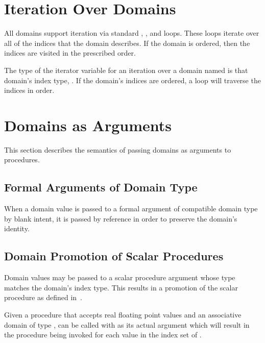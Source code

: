\section{Iteration Over Domains}
\label{Iteration_over_Domains}

All domains support iteration via standard , , and 
loops.  These loops iterate over all of the indices that the domain
describes.  If the domain is ordered, then the indices are visited in the
prescribed order.  

The type of the iterator variable for an iteration over a
domain named  is that domain's index type, .
If the domain's indices are ordered, a  loop will traverse the
indices in order.


\section{Domains as Arguments}
\label{Domain_Arguments}

This section describes the semantics of passing domains as arguments
to procedures.

\subsection{Formal Arguments of Domain Type}

When a domain value is passed to a formal argument of compatible
domain type by blank intent, it is passed by reference in order to
preserve the domain's identity.

\subsection{Domain Promotion of Scalar Procedures}
\label{Domain_Promotion_of_Scalar_Procedures}

Domain values may be passed to a scalar procedure argument whose type
matches the domain's index type.  This results in a promotion of the
scalar procedure as defined in~.

\begin{example}
Given a procedure  that accepts real floating point values
and an associative domain  of
type ,  can be called with  as
its actual argument which will result in the procedure being invoked
for each value in the index set of .
\end{example}

